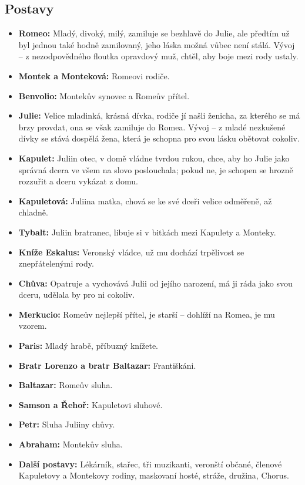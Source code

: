 \documentclass[12pt, a4paper]{article}
\begin{document}
\subsection*{Postavy}
\begin{itemize}[itemsep=0.3em]
	\item \textbf{Romeo:} Mladý, divoký, milý, zamiluje se bezhlavě do Julie, ale předtím už byl jednou také hodně zamilovaný, jeho láska možná vůbec není stálá. Vývoj -- z nezodpovědného floutka opravdový muž, chtěl, aby boje mezi rody ustaly.
	\item \textbf{Montek a Monteková:} Romeovi rodiče.
	\item \textbf{Benvolio:} Montekův synovec a Romeův přítel.
	\item \textbf{Julie:} Velice mladinká, krásná dívka, rodiče jí našli ženicha, za kterého se má brzy provdat, ona se však zamiluje do Romea. Vývoj -- z mladé nezkušené dívky se stává dospělá žena, která je schopna pro svou lásku obětovat cokoliv.
	\item \textbf{Kapulet:} Juliin otec, v domě vládne tvrdou rukou, chce, aby ho Julie jako správná dcera ve všem na slovo poslouchala; pokud ne, je schopen se hrozně rozzuřit a dceru vykázat z domu.
	\item \textbf{Kapuletová:} Juliina matka, chová se ke své dceři velice odměřeně, až chladně.
	\item \textbf{Tybalt:} Juliin bratranec, libuje si v bitkách mezi Kapulety a Monteky.
	\item \textbf{Kníže Eskalus:} Veronský vládce, už mu dochází trpělivost se znepřátelenými rody.
	\item \textbf{Chůva:} Opatruje a vychovává Julii od jejího narození, má ji ráda jako svou dceru, udělala by pro ni cokoliv.
	\item \textbf{Merkucio:} Romeův nejlepší přítel, je starší -- dohlíží na Romea, je mu vzorem.
	\item \textbf{Paris:} Mladý hrabě, příbuzný knížete.
	\item \textbf{Bratr Lorenzo a bratr Baltazar:} Františkáni.
	\item \textbf{Baltazar:} Romeův sluha.
	\item \textbf{Samson a Řehoř:} Kapuletovi sluhové.
	\item \textbf{Petr:} Sluha Juliiny chůvy.
	\item \textbf{Abraham:} Montekův sluha.
	\item \textbf{Další postavy:} Lékárník, stařec, tři muzikanti, veronští občané, členové Kapuletovy a Montekovy rodiny, maskovaní hosté, stráže, družina, Chorus.
\end{itemize}
\end{document}
